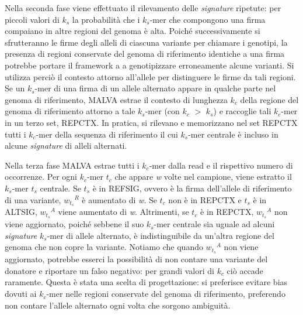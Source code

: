\documentclass[../main.tex]{subfiles}
\begin{document}
Nella seconda fase viene effettuato il rilevamento delle \textit{signature} ripetute: per piccoli valori di  \textit{${k}_{s}$} la probabilità che i  \textit{${k}_{s}$}-mer che compongono una firma compaiano in altre regioni del genoma è alta. Poiché successivamente si sfrutteranno le firme degli alleli di ciascuna variante per chiamare i genotipi, la presenza di regioni conservate del genoma di riferimento identiche a una firma potrebbe portare il framework a a genotipizzare erroneamente alcune varianti. Si utilizza perciò il contesto attorno all'allele per distinguere le firme da tali regioni. Se un  \textit{${k}_{s}$}-mer di una firma di un allele alternato appare in qualche parte nel genoma di riferimento, MALVA estrae il contesto di lunghezza  \textit{${k}_{c}$} della regione del genoma di riferimento attorno a tale  \textit{${k}_{s}$}-mer (con  \textit{${k}_{c}$} $>$  \textit{${k}_{s}$}) e raccoglie tali  \textit{${k}_{c}$}-mer in un terzo set, REPCTX. In pratica, si rilevano e memorizzano nel set REPCTX  tutti i  \textit{${k}_{c}$}-mer della sequenza di riferimento il cui \textit{${k}_{s}$}-mer centrale è incluso in alcune \textit{signature} di alleli alternati. 

Nella terza fase MALVA estrae tutti i  \textit{${k}_{c}$}-mer dalla read e il rispettivo numero di occorrenze. Per ogni  \textit{${k}_{c}$}-mer  \textit{${t}_{c}$} che appare \textit{w} volte nel campione, viene estratto il  \textit{${k}_{s}$}-mer  \textit{${t}_{s}$} centrale. Se  \textit{${t}_{s}$} è in REFSIG, ovvero è la firma dell'allele di riferimento di una variante, \textit{${w_{{t}_{s}}}^{R}$} è aumentato di \textit{w}. Se  \textit{${t}_{c}$} non è in REPCTX e  \textit{${t}_{s}$} è in ALTSIG, \textit{${w_{{t}_{s}}}^{A}$} viene aumentato di \textit{w}. Altrimenti, se  \textit{${t}_{c}$} è in REPCTX, \textit{${w_{{t}_{s}}}^{A}$} non viene aggiornato, poiché sebbene il suo \textit{${k}_{s}$}-mer centrale sia uguale ad alcuni \textit{signature}  \textit{${k}_{s}$}-mer di allele alternato, è indistinguibile da un'altra regione del genoma che non copre la variante. Notiamo che quando \textit{${w_{{t}_{s}}}^{A}$} non viene aggiornato, potrebbe esserci la possibilità di non contare una variante del donatore e riportare un falso negativo: per grandi valori di  \textit{${k}_{c}$} ciò accade raramente. Questa è stata una scelta di progettazione: si preferisce evitare bias dovuti ai \textit{${k}_{c}$}-mer nelle regioni conservate del genoma di riferimento, preferendo non contare l'allele alternato ogni volta che sorgono ambiguità.
\end{document}
